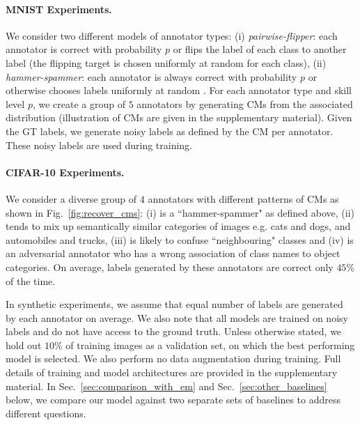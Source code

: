 \paragraph{MNIST Experiments.} We consider two different models of annotator types: (i) \textit{pairwise-flipper}: each annotator is correct with probability $p$ or flips the label of each class to another label (the flipping target is chosen uniformly at random for each class), (ii) \textit{hammer-spammer}: each annotator is always correct with probability $p$ or otherwise chooses labels uniformly at random \cite{khetan2017learning}. For each annotator type and skill level $p$, we create a group of $5$ annotators by generating CMs from the associated distribution (illustration of CMs are given in the supplementary material). Given the GT labels, we generate noisy labels as defined by the CM per annotator. These noisy labels are used during training.



\paragraph{CIFAR-10 Experiments.} We consider a diverse group of $4$ annotators with different patterns of CMs as shown in Fig.~\ref{fig:recover_cms}: (i) is a ``hammer-spammer" as defined above, (ii) tends to mix up semantically similar categories of images e.g. cats and dogs, and automobiles and trucks, (iii) is likely to confuse ``neighbouring" classes and (iv) is an adversarial annotator who has a wrong association of class names to object categories. On average, labels generated by these annotators are correct only $45\%$ of the time.

In synthetic experiments, we assume that equal number of labels are generated by each annotator on average. We also note that all models are trained on noisy labels and do not have access to the ground truth. Unless otherwise stated, we hold out $10\%$ of training images as a validation set, on which the best performing model is selected. We also perform no data augmentation during training. Full details of training and model architectures are provided in the supplementary material. In Sec.~\ref{sec:comparison_with_em} and Sec.~\ref{sec:other_baselines} below, we compare our model against two separate sets of baselines to address different questions. 

